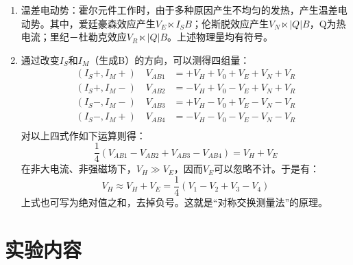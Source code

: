 \documentclass[11pt]{article}
\begin{document}
\begin{enumerate}
\begin{enumerate}
        \item 温差电动势：霍尔元件工作时，由于多种原因产生不均匀的发热，产生温差电动势。其中，爱廷豪森效应产生$V_E\ltimes I_SB$；伦斯脱效应产生$V_N\ltimes \left|Q\right|B$，Q为热电流；里纪－杜勒克效应$V_R\ltimes \left|Q\right|B$。上述物理量均有符号。
        \item 通过改变$I_S$和$I_M$（生成B）的方向，可以测得四组量：
        \begin{equation}
            \begin{aligned}
                (I_S+,I_M+)\quad V_{AB1}&=+V_H+V_0+V_E+V_N+V_R\\
                (I_S+,I_M-)\quad V_{AB2}&=-V_H+V_0-V_E+V_N+V_R\\
                (I_S-,I_M-)\quad V_{AB3}&=+V_H-V_0+V_E-V_N-V_R\\
                (I_S-,I_M+)\quad V_{AB4}&=-V_H-V_0-V_E-V_N-V_R\\
            \end{aligned}
        \end{equation}
        对以上四式作如下运算则得：
        \begin{equation}
            \frac{1}{4}\left(V_{AB1}-V_{AB2}+V_{AB3}-V_{AB4}\right)=V_H+V_E
        \end{equation}
        在非大电流、非强磁场下，$V_H\gg V_E$，因而$V_E$可以忽略不计。于是有：
        \begin{equation}
            V_H\approx V_H+V_E=\frac{1}{4}\left(V_{1}-V_{2}+V_{3}-V_{4}\right)
        \end{equation}
        上式也可写为绝对值之和，去掉负号。这就是“对称交换测量法”的原理。
    \end{enumerate}
\end{enumerate}


\section{实验内容}
\end{document}
